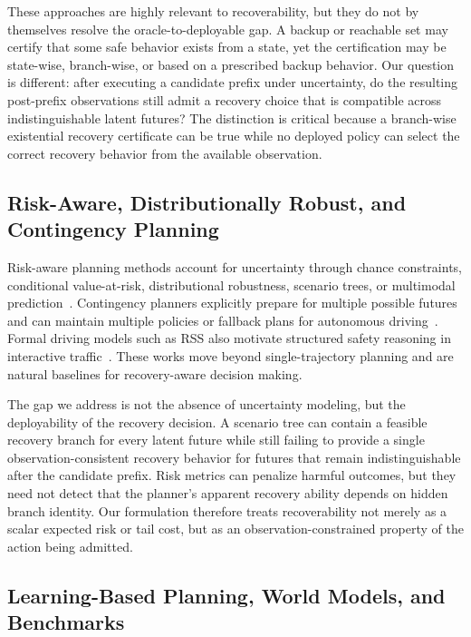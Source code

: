\documentclass[conference]{IEEEtran}
\begin{document}
These approaches are highly relevant to recoverability, but they do not by themselves resolve the oracle-to-deployable gap.  A backup or reachable set may certify that some safe behavior exists from a state, yet the certification may be state-wise, branch-wise, or based on a prescribed backup behavior.  Our question is different: after executing a candidate prefix under uncertainty, do the resulting post-prefix observations still admit a recovery choice that is compatible across indistinguishable latent futures?  The distinction is critical because a branch-wise existential recovery certificate can be true while no deployed policy can select the correct recovery behavior from the available observation.

\subsection{Risk-Aware, Distributionally Robust, and Contingency Planning}

Risk-aware planning methods account for uncertainty through chance constraints, conditional value-at-risk, distributional robustness, scenario trees, or multimodal prediction~\cite{uryasev2000conditional,hakobyan2021wasserstein,safaoui2024distributionally,batkovic2020robust,nair2024predictive}.  Contingency planners explicitly prepare for multiple possible futures and can maintain multiple policies or fallback plans for autonomous driving~\cite{li2023marc,mustafa2024racp}.  Formal driving models such as RSS also motivate structured safety reasoning in interactive traffic~\cite{shalev2017formal}.  These works move beyond single-trajectory planning and are natural baselines for recovery-aware decision making.

The gap we address is not the absence of uncertainty modeling, but the deployability of the recovery decision.  A scenario tree can contain a feasible recovery branch for every latent future while still failing to provide a single observation-consistent recovery behavior for futures that remain indistinguishable after the candidate prefix.  Risk metrics can penalize harmful outcomes, but they need not detect that the planner's apparent recovery ability depends on hidden branch identity.  Our formulation therefore treats recoverability not merely as a scalar expected risk or tail cost, but as an observation-constrained property of the action being admitted.

\subsection{Learning-Based Planning, World Models, and Benchmarks}
\end{document}
